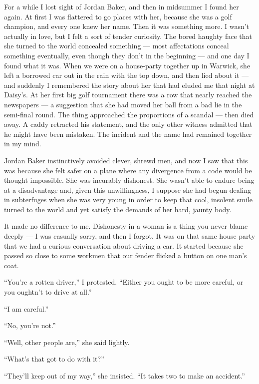 \documentclass{znotebook}
\begin{document}
For a while I lost sight of Jordan Baker, and then in midsummer I found her again. At first I was flattered to go places with her, because she was a golf champion, and every one knew her name. Then it was something more. I wasn't actually in love, but I felt a sort of tender curiosity. The bored haughty face that she turned to the world concealed something ---{} most affectations conceal something eventually, even though they don't in the beginning ---{} and one day I found what it was. When we were on a house-party together up in Warwick, she left a borrowed car out in the rain with the top down, and then lied about it ---{} and suddenly I remembered the story about her that had eluded me that night at Daisy's. At her first big golf tournament there was a row that nearly reached the newspapers ---{} a suggestion that she had moved her ball from a bad lie in the semi-final round. The thing approached the proportions of a scandal ---{} then died away. A caddy retracted his statement, and the only other witness admitted that he might have been mistaken. The incident and the name had remained together in my mind.

Jordan Baker instinctively avoided clever, shrewd men, and now I saw that this was because she felt safer on a plane where any divergence from a code would be thought impossible. She was incurably dishonest. She wasn't able to endure being at a disadvantage and, given this unwillingness, I suppose she had begun dealing in subterfuges when she was very young in order to keep that cool, insolent smile turned to the world and yet satisfy the demands of her hard, jaunty body.

It made no difference to me. Dishonesty in a woman is a thing you never blame deeply ---{} I was casually sorry, and then I forgot. It was on that same house party that we had a curious conversation about driving a car. It started because she passed so close to some workmen that our fender flicked a button on one man's coat.

``You're a rotten driver,'' I protested. ``Either you ought to be more careful, or you oughtn't to drive at all.''

``I am careful.''

``No, you're not.''

``Well, other people are,'' she said lightly.

``What's that got to do with it?''

``They'll keep out of my way,'' she insisted. ``It takes two to make an accident.''
\end{document}
